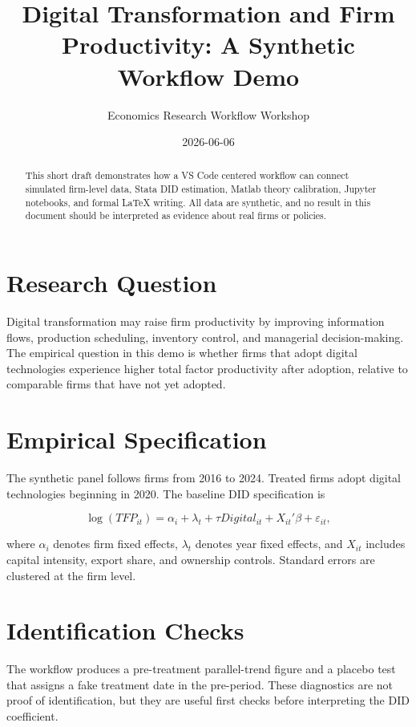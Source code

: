 \documentclass[11pt]{article}
\title{Digital Transformation and Firm Productivity: A Synthetic Workflow Demo}
\author{Economics Research Workflow Workshop}
\date{2026-06-06}
\begin{document}
\maketitle

\begin{abstract}
This short draft demonstrates how a VS Code centered workflow can connect simulated firm-level data, Stata DID estimation, Matlab theory calibration, Jupyter notebooks, and formal \LaTeX{} writing. All data are synthetic, and no result in this document should be interpreted as evidence about real firms or policies.
\end{abstract}

\section{Research Question}

Digital transformation may raise firm productivity by improving information flows, production scheduling, inventory control, and managerial decision-making. The empirical question in this demo is whether firms that adopt digital technologies experience higher total factor productivity after adoption, relative to comparable firms that have not yet adopted.

\section{Empirical Specification}

The synthetic panel follows firms from 2016 to 2024. Treated firms adopt digital technologies beginning in 2020. The baseline DID specification is

\begin{equation}
\log(TFP_{it}) = \alpha_i + \lambda_t + \tau Digital_{it} + X_{it}'\beta + \varepsilon_{it},
\end{equation}

where $\alpha_i$ denotes firm fixed effects, $\lambda_t$ denotes year fixed effects, and $X_{it}$ includes capital intensity, export share, and ownership controls. Standard errors are clustered at the firm level.

\section{Identification Checks}

The workflow produces a pre-treatment parallel-trend figure and a placebo test that assigns a fake treatment date in the pre-period. These diagnostics are not proof of identification, but they are useful first checks before interpreting the DID coefficient.
\end{document}
